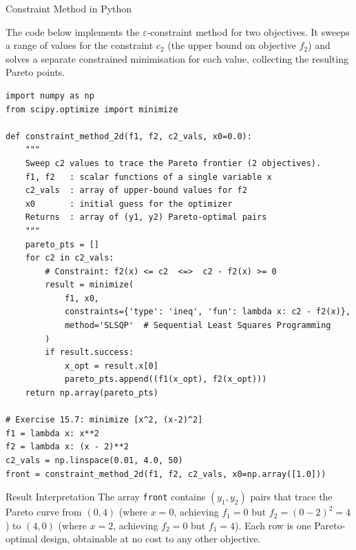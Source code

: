 \documentclass[aspectratio=169,10pt]{beamer}
\begin{document}
\begin{frame}[fragile]{Constraint Method in Python}

The code below implements the $\varepsilon$-constraint method for two
objectives.  It sweeps a range of values for the constraint $c_2$ (the upper
bound on objective $f_2$) and solves a separate constrained minimisation
for each value, collecting the resulting Pareto points.

\begin{lstlisting}
import numpy as np
from scipy.optimize import minimize

def constraint_method_2d(f1, f2, c2_vals, x0=0.0):
    """
    Sweep c2 values to trace the Pareto frontier (2 objectives).
    f1, f2   : scalar functions of a single variable x
    c2_vals  : array of upper-bound values for f2
    x0       : initial guess for the optimizer
    Returns  : array of (y1, y2) Pareto-optimal pairs
    """
    pareto_pts = []
    for c2 in c2_vals:
        # Constraint: f2(x) <= c2  <=>  c2 - f2(x) >= 0
        result = minimize(
            f1, x0,
            constraints={'type': 'ineq', 'fun': lambda x: c2 - f2(x)},
            method='SLSQP'  # Sequential Least Squares Programming
        )
        if result.success:
            x_opt = result.x[0]
            pareto_pts.append((f1(x_opt), f2(x_opt)))
    return np.array(pareto_pts)

# Exercise 15.7: minimize [x^2, (x-2)^2]
f1 = lambda x: x**2
f2 = lambda x: (x - 2)**2
c2_vals = np.linspace(0.01, 4.0, 50)
front = constraint_method_2d(f1, f2, c2_vals, x0=np.array([1.0]))
\end{lstlisting}

\begin{block}{Result Interpretation}
  The array \texttt{front} contains $(y_1, y_2)$ pairs that trace the Pareto
  curve from $(0, 4)$ (where $x=0$, achieving $f_1=0$ but $f_2=(0-2)^2=4$) to
  $(4, 0)$ (where $x=2$, achieving $f_2=0$ but $f_1=4$).  Each row is one
  Pareto-optimal design, obtainable at no cost to any other objective.
\end{block}

\end{frame}
\end{document}
